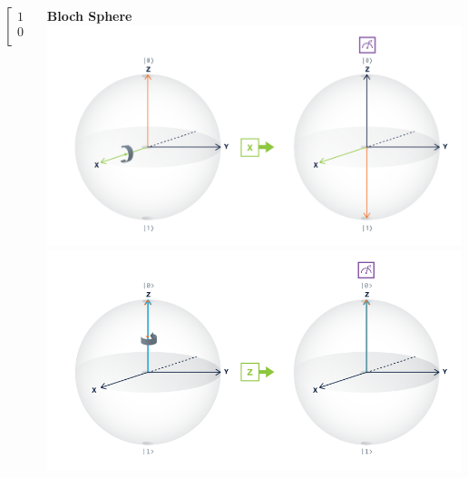 \documentclass[aspectratio=169,11pt,hyperref={colorlinks=true}]{beamer}
\begin{document}
\begin{frame}
\begin{columns}[onlytextwidth]
\begin{column}{.333\textwidth}
            \[\begin{bmatrix}
                1 & 0 \\
                0 & -1\\
            \end{bmatrix}\]
        \end{column}
        \begin{column}{.333\textwidth}
            \centering
            \textbf{Bloch Sphere}
            \includegraphics[width=\textwidth]{gate_x_bloch.png}\\
            \includegraphics[width=\textwidth]{gate_z_bloch.png}\\
        \end{column}
    \end{columns}
\end{frame}
\end{document}
